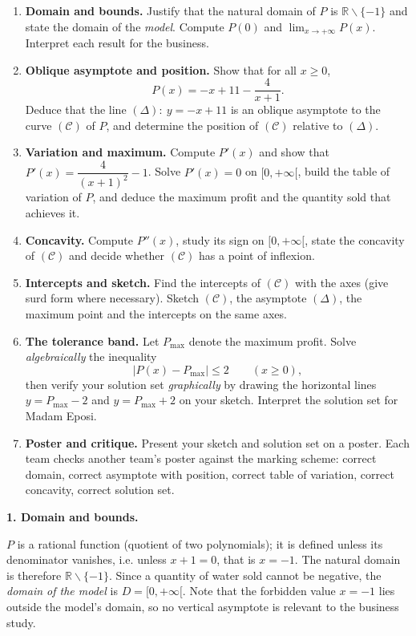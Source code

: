 \documentclass[11pt]{article}
\newcommand{\cle}[1]{{\popxbold\color{popdark}#1}}
\newcounter{popsec}
\newcounter{popsub}
\newcommand{\courssub}[1]{%
  \stepcounter{popsub}%
  \par\vspace{9pt}\noindent{\popxbold\fontsize{11.5}{13}\selectfont\color{popink}{\color{poporange}\thepopsec.\thepopsub}\hspace{6pt}#1}\par\nopagebreak\vspace{4pt}
}
\def\setminus{\mathbin{\backslash}}\let\smallsetminus\setminus
\begin{document}
\begin{enumerate}
\item \textbf{Domain and bounds.} Justify that the natural domain of $P$ is $\mathbb{R}\setminus\{-1\}$ and state the domain of the \emph{model}. Compute $P(0)$ and $\displaystyle\lim_{x\to+\infty}P(x)$. Interpret each result for the business.
\item \textbf{Oblique asymptote and position.} Show that for all $x\ge 0$,
\[
P(x)=-x+11-\frac{4}{x+1}.
\]
Deduce that the line $(\Delta):\ y=-x+11$ is an oblique asymptote to the curve $(\mathcal{C})$ of $P$, and determine the position of $(\mathcal{C})$ relative to $(\Delta)$.
\item \textbf{Variation and maximum.} Compute $P'(x)$ and show that $P'(x)=\dfrac{4}{(x+1)^{2}}-1$. Solve $P'(x)=0$ on $[0,+\infty[$, build the table of variation of $P$, and deduce the maximum profit and the quantity sold that achieves it.
\item \textbf{Concavity.} Compute $P''(x)$, study its sign on $[0,+\infty[$, state the concavity of $(\mathcal{C})$ and decide whether $(\mathcal{C})$ has a point of inflexion.
\item \textbf{Intercepts and sketch.} Find the intercepts of $(\mathcal{C})$ with the axes (give surd form where necessary). Sketch $(\mathcal{C})$, the asymptote $(\Delta)$, the maximum point and the intercepts on the same axes.
\item \textbf{The tolerance band.} Let $P_{\max}$ denote the maximum profit. Solve \emph{algebraically} the inequality
\[
\left|P(x)-P_{\max}\right|\le 2 \qquad (x\ge 0),
\]
then verify your solution set \emph{graphically} by drawing the horizontal lines $y=P_{\max}-2$ and $y=P_{\max}+2$ on your sketch. Interpret the solution set for Madam Eposi.
\item \textbf{Poster and critique.} Present your sketch and solution set on a poster. Each team checks another team's poster against the marking scheme: correct domain, correct asymptote with position, correct table of variation, correct concavity, correct solution set.
\end{enumerate}

\courssub{Model answer}

\textbf{1. Domain and bounds.}\par
$P$ is a rational function (quotient of two polynomials); it is defined unless its denominator vanishes, i.e. unless $x+1=0$, that is $x=-1$. The \cle{natural domain} is therefore $\mathbb{R}\setminus\{-1\}$. Since a quantity of water sold cannot be negative, the \emph{domain of the model} is $D=[0,+\infty[$. Note that the forbidden value $x=-1$ lies outside the model's domain, so no vertical asymptote is relevant to the business study.
\end{document}
